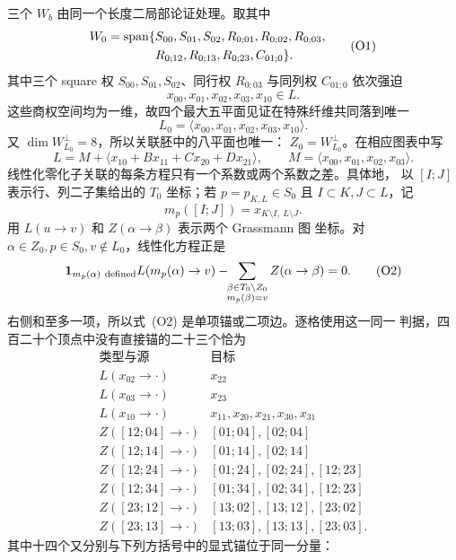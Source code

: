 三个 \(W_b\) 由同一个长度二局部论证处理。取其中
\[
\begin{aligned}
W_0=\operatorname{span}\{&
S_{00},S_{01},S_{02},
R_{0;01},R_{0;02},R_{0;03},\\
&R_{0;12},R_{0;13},R_{0;23},C_{01;0}\}.
\end{aligned}                                                     \tag{O1}
\]
其中三个 square 权 \(S_{00},S_{01},S_{02}\)、同行权
\(R_{0;03}\) 与同列权 \(C_{01;0}\) 依次强迫
\[
 x_{00},x_{01},x_{02},x_{03},x_{10}\in L.
\]
这些商权空间均为一维，故四个最大五平面见证在特殊纤维共同落到唯一
\[
 L_0=\langle x_{00},x_{01},x_{02},x_{03},x_{10}\rangle.
\]
又 \(\dim W_{L_0}^{\perp}=8\)，所以关联胚中的八平面也唯一：
\(Z_0=W_{L_0}^{\perp}\)。在相应图表中写
\[
 L=M+\langle x_{10}+Bx_{11}+Cx_{20}+Dx_{21}\rangle,
 \qquad M=\langle x_{00},x_{01},x_{02},x_{03}\rangle.
\]
线性化零化子关联的每条方程只有一个系数或两个系数之差。具体地，
以 \([I;J]\) 表示行、列二子集给出的 \(T_0\) 坐标；若
\(p=p_{K,L}\in S_0\) 且 \(I\subset K,J\subset L\)，记
\[
m_p([I;J])=x_{K\setminus I,\ L\setminus J}.
\]
用 \(L(u\to v)\) 和 \(Z(\alpha\to\beta)\) 表示两个 Grassmann 图
坐标。对 \(\alpha\in Z_0,p\in S_0,v\notin L_0\)，线性化方程正是
\[
\mathbf1_{m_p(\alpha)\ {\rm defined}}L(m_p(\alpha)\to v)
-\!\!\sum_{\substack{\beta\in T_0\setminus Z_0\\m_p(\beta)=v}}
 Z(\alpha\to\beta)=0.                                      \tag{O2}
\]
右侧和至多一项，所以式~(O2) 是单项锚或二项边。逐格使用这一同一
判据，四百二十个顶点中没有直接锚的二十三个恰为
\[
\begin{array}{c|l}
\text{类型与源}&\text{目标}\\ \hline
L(x_{02}\to\cdot)&x_{22}\\
L(x_{03}\to\cdot)&x_{23}\\
L(x_{10}\to\cdot)&x_{11},x_{20},x_{21},x_{30},x_{31}\\
Z([12;04]\to\cdot)&[01;04],[02;04]\\
Z([12;14]\to\cdot)&[01;14],[02;14]\\
Z([12;24]\to\cdot)&[01;24],[02;24],[12;23]\\
Z([12;34]\to\cdot)&[01;34],[02;34],[12;23]\\
Z([23;12]\to\cdot)&[13;02],[13;12],[23;02]\\
Z([23;13]\to\cdot)&[13;03],[13;13],[23;03].
\end{array}                                                  \tag{O3}
\]
其中十四个又分别与下列方括号中的显式锚位于同一分量：
